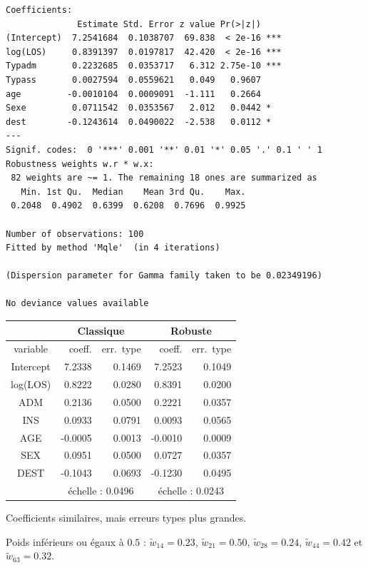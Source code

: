 \documentclass{BeamerTemplate}
\begin{document}
\begin{refsection}
\begin{frame}[fragile]{}
{\begin{verbatim}
Coefficients:
              Estimate Std. Error z value Pr(>|z|)    
(Intercept)  7.2541684  0.1038707  69.838  < 2e-16 ***
log(LOS)     0.8391397  0.0197817  42.420  < 2e-16 ***
Typadm       0.2232685  0.0353717   6.312 2.75e-10 ***
Typass       0.0027594  0.0559621   0.049   0.9607    
age         -0.0010104  0.0009091  -1.111   0.2664    
Sexe         0.0711542  0.0353567   2.012   0.0442 *  
dest        -0.1243614  0.0490022  -2.538   0.0112 *  
---
Signif. codes:  0 '***' 0.001 '**' 0.01 '*' 0.05 '.' 0.1 ' ' 1
Robustness weights w.r * w.x: 
 82 weights are ~= 1. The remaining 18 ones are summarized as
   Min. 1st Qu.  Median    Mean 3rd Qu.    Max. 
 0.2048  0.4902  0.6399  0.6208  0.7696  0.9925 

Number of observations: 100 
Fitted by method 'Mqle'  (in 4 iterations)

(Dispersion parameter for Gamma family taken to be 0.02349196)

No deviance values available 
\end{verbatim}
}
\end{frame}

\begin{frame}{}
  \begin{center}
  \begin{tabular}{|c|rr|rr|}
  \hline
  & \multicolumn{2}{c|}{Classique}  &   \multicolumn{2}{c|}{Robuste}\\
   \hline
  variable  & coeff. & err.\ type &  coeff. & err.\ type \\
  \hline
  Intercept & 7.2338 & 0.1469 & 7.2523 & 0.1049 \\
  log(LOS) &  0.8222 & 0.0280 & 0.8391 & 0.0200 \\
  ADM & 0.2136 & 0.0500 & 0.2221 & 0.0357\\
  INS & 0.0933 & 0.0791 & 0.0093 & 0.0565\\
  AGE & -0.0005 & 0.0013 & -0.0010 & 0.0009\\
  SEX & 0.0951 & 0.0500 & 0.0727 & 0.0357\\
  DEST & -0.1043 & 0.0693 & -0.1230 & 0.0495 \\
  \hline
   & \multicolumn{2}{c|}{échelle : 0.0496}  & \multicolumn{2}{c|}{échelle : 0.0243}
  \\
  \hline
  \end{tabular}
  \end{center}
  
Coefficients similaires, mais erreurs types plus grandes.

\bigskip
Poids inférieurs ou égaux à $0.5$ : $\tilde{w}_{14} = 0.23$,
$\tilde{w}_{21} = 0.50$, $\tilde{w}_{28} = 0.24$, $\tilde{w}_{44} = 0.42$ et
$\tilde{w}_{63} = 0.32$.


\end{frame}
\end{refsection}
\end{document}
